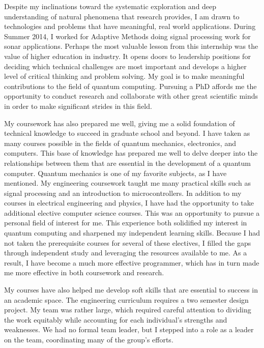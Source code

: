 {    Despite my inclinations toward the systematic exploration and deep
    understanding of natural phenomena that research provides, I am drawn to
    technologies and problems that have meaningful, real world applications.
    During Summer 2014, I worked for Adaptive Methods doing signal processing
    work for sonar applications. Perhaps the most valuable lesson from this
    internship was the value of higher education in industry. It opens doors to
    leadership positions for deciding which technical challenges are most
    important and develops a higher level of critical thinking and problem
    solving. My goal is to make meaningful contributions to the field of
    quantum computing. Pursuing a PhD affords me the opportunity to conduct
    research and collaborate with other great scientific minds in order to make
    significant strides in this field.

    My coursework has also prepared me well, giving me a solid foundation of
    technical knowledge to succeed in graduate school and beyond. I have
    taken as many courses possible in the fields of quantum mechanics,
    electronics, and computers.  This base of knowledge has prepared me well to
    delve deeper into the relationships between them that are essential in the
    development of a quantum computer.  Quantum mechanics is one of my favorite
    subjects, as I have mentioned. My engineering coursework taught me many
    practical skills such as signal processing and an introduction to
    microcontrollers.  In addition to my courses in electrical engineering and
    physics, I have had the opportunity to take additional elective computer
    science courses. This was an opportunity to pursue a personal field of
    interest for me.  This experience both solidified my interest in quantum
    computing and sharpened my independent learning skills. Because I had not
    taken the prerequisite courses for several of these electives, I filled the
    gaps through independent study and leveraging the resources available to
    me. As a result, I have become a much more effective programmer, which has
    in turn made me more effective in both coursework and research.

    My courses have also helped me develop soft skills that are essential to
    success in an academic space. The engineering curriculum requires a two
    semester design project.  My team was rather large, which required careful
    attention to dividing the work equitably while accounting for each
    individual's strengths and weaknesses.  We had no formal team leader, but I
    stepped into a role as a leader on the team, coordinating many of the
    group's efforts.

}
